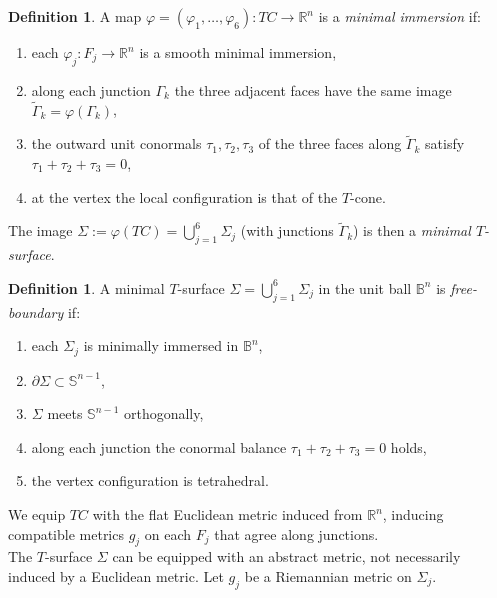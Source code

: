 \documentclass[11pt]{amsart}
\numberwithin{equation}{section}
\theoremstyle{theorem}
\theoremstyle{definition}
\newtheorem{definition}[theorem]{Definition}
\numberwithin{equation}{section}
\begin{document}
\begin{definition}
A map $\varphi = (\varphi_1,\dots,\varphi_6) : TC \to \mathbb{R}^n$ is a \emph{minimal immersion} if:
\begin{enumerate}
    \item[(i)] each $\varphi_j : F_j \to \mathbb{R}^n$ is a smooth minimal immersion,
    \item[(ii)] along each junction $\Gamma_k$ the three adjacent faces have the same image $\tilde{\Gamma}_k = \varphi(\Gamma_k)$,
    \item[(iii)] the outward unit conormals $\tau_1,\tau_2,\tau_3$ of the three faces along $\tilde{\Gamma}_k$ satisfy $\tau_1 + \tau_2 + \tau_3 = 0$,
    \item[(iv)] at the vertex the local configuration is that of the $T$-cone.
\end{enumerate}
The image $\Sigma := \varphi(TC) = \bigcup_{j=1}^6 \Sigma_j$ (with junctions $\tilde{\Gamma}_k$) is then a \emph{minimal $T$-surface}.
\end{definition}

\begin{definition}
A minimal $T$-surface $\Sigma = \bigcup_{j=1}^6 \Sigma_j$ in the unit ball $\mathbb{B}^n$ is \emph{free-boundary} if:
\begin{enumerate}
    \item each $\Sigma_j$ is minimally immersed in $\mathbb{B}^n$,
    \item $\partial \Sigma \subset \mathbb{S}^{n-1}$,
    \item $\Sigma$ meets $\mathbb{S}^{n-1}$ orthogonally,
    \item along each junction the conormal balance $\tau_1 + \tau_2 + \tau_3 = 0$ holds,
    \item the vertex configuration is tetrahedral.
\end{enumerate}
\end{definition}

We equip $TC$ with the flat Euclidean metric induced from $\mathbb{R}^n$, inducing compatible metrics $g_j$ on each $F_j$ that agree along junctions.\\
The $T$-surface $\Sigma$ can be equipped with an abstract metric,
not necessarily induced by a Euclidean metric.
Let $g_j$ be a Riemannian metric on $\Sigma_j$.
\medskip
\end{document}

